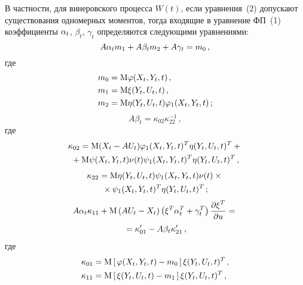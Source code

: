 \begin{multicols}{2}
В частности, для винеровского процесса  $W(t)$, если уравнения~(2)
допускают существования одномерных моментов, тогда входящие
в уравнение ФП~(1) коэффициенты  $\alpha_t$,
$\beta_t$, $\gamma_t$ определяются следующими уравнениями:
\begin{equation} %
A\alp_t m_1 + A\beta_t m_2 + A\gamma_t=m_0\,,
\end{equation}
\vspace*{-12pt}
где\\[-12pt]  %
\begin{align*}
m_0 &= {\rm M}\varphi \yxtt\,,\\ %
m_1 &= {\rm M}\xi \yutt\,, \\ %
m_2 &= {\rm M}\eta \yutt \varphi_1\yxtt\,; %
\end{align*}
\vspace*{-12pt}
    \begin{equation} %
A\beta_t =\kappa_{02} \kappa_{22}^{-1}\,,
\end{equation}
где\\[-18pt] %
\begin{multline*}
\kappa_{02} = {\rm M} (X_t - AU_t) \varphi_1 \yxtt^T \eta\yutt^T+{}\\
        {}+ {\rm M}\psi \yxtt \nu(t) \psi_1 \yxtt^T \eta \yutt^T\,, %
\end{multline*}
\vspace*{-24pt}
\begin{multline*}
\kappa_{22}  = {\rm M}\eta\yutt \psi_1 \yxtt \nu(t)\times {}\\
{}\times\psi_1 \yxtt^T \eta\yutt^T\,; %
\end{multline*}
\vspace*{-18pt}
\begin{multline} A\alp_t\kappa_{11} + {\rm M}\left( 
AU_t-X_t\right)\left(\xi^T \alp_t^T +\gamma_t^T\right)
   \fr{\partial \xi^T}{\partial u}={} \\
{}=\kappa_{01}'-A\beta_t\kappa_{21}'\,,%
\end{multline}
где\\[-12pt]
\begin{align*}
\kappa_{01} &= {\rm M}\lk \varphi \yxtt - m_0\rk \xi \yutt^T\,,\\
 \kappa_{11} &= {\rm M}\lk \xi \yutt - m_1\rk \xi \yutt^T\,,\\

\end{align*}
\end{multicols}
